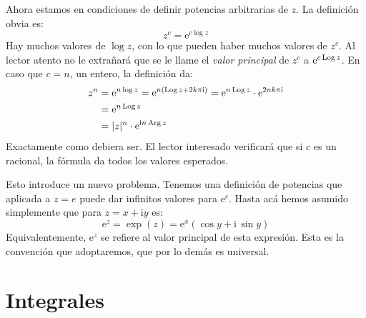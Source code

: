   Ahora estamos en condiciones
  de definir potencias arbitrarias de \(z\).%
  La definición obvia es:
  \begin{equation*}
    z^c
      = \mathrm{e}^{c \log z}
  \end{equation*}
  Hay muchos valores de \(\log z\),
  con lo que pueden haber muchos valores de \(z^c\).
  Al lector atento no le extrañará
  que se le llame el \emph{valor principal} de \(z^c\)
  a \(\mathrm{e}^{c \operatorname{Log} z}\).%
  En caso que \(c = n\),
  un entero,
  la definición da:
  \begin{align*}
    z^n
      &= \mathrm{e}^{n \log z}
       = \mathrm{e}^{n (\operatorname{Log} z + 2 k \pi \mathrm{i})}
       = \mathrm{e}^{n \operatorname{Log} z}
	   \cdot \mathrm{e}^{2 n k \pi \mathrm{i}} \\
      &= \mathrm{e}^{n \operatorname{Log} z} \\
      &= \lvert z \rvert^n \cdot \mathrm{e}^{\mathrm{i} n \operatorname{Arg} z}
  \end{align*}
  Exactamente como debiera ser.
  El lector interesado verificará que si \(c\) es un racional,
  la fórmula da todos los valores esperados.

  Esto introduce un nuevo problema.
  Tenemos una definición de potencias que aplicada a \(z = e\)
  puede dar infinitos valores para \(\mathrm{e}^c\).
  Hasta acá hemos asumido simplemente
  que para \(z = x + \mathrm{i} y\)
  es:
  \begin{equation*}
    \mathrm{e}^z
      = \exp(z)
      = \mathrm{e}^x (\cos y + \mathrm{i} \, \sin y)
  \end{equation*}
  Equivalentemente,
  \(\mathrm{e}^z\) se refiere al valor principal de esta expresión.
  Esta es la convención que adoptaremos,
  que por lo demás es universal.

\section{Integrales}
\label{sec:complex-integrals}

